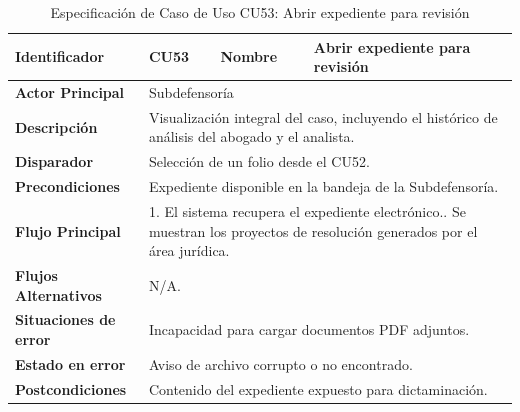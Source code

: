 \vspace{0.8cm}

\begingroup
\setlength{\parskip}{0pt}
\begin{longtable}{|p{3.5cm}|p{2cm}|p{2.5cm}|p{7cm}|}
\caption{Especificación de Caso de Uso CU53: Abrir expediente para revisión}
\label{tab:cu53} \\
\hline
\textbf{Identificador} & CU53 & \textbf{Nombre} & Abrir expediente para revisión \\ \hline
\textbf{Actor Principal} & \multicolumn{3}{p{11.5cm}|}{Subdefensoría} \\ \hline
\textbf{Descripción} & \multicolumn{3}{p{11.5cm}|}{Visualización integral del caso, incluyendo el histórico de análisis del abogado y el analista.} \\ \hline
\textbf{Disparador} & \multicolumn{3}{p{11.5cm}|}{Selección de un folio desde el CU52.} \\ \hline
\textbf{Precondiciones} & \multicolumn{3}{p{11.5cm}|}{Expediente disponible en la bandeja de la Subdefensoría.} \\ \hline
\textbf{Flujo Principal} & \multicolumn{3}{p{11.5cm}|}{1. El sistema recupera el expediente electrónico.\newline 2. Se muestran los proyectos de resolución generados por el área jurídica.} \\ \hline
\textbf{Flujos Alternativos} & \multicolumn{3}{p{11.5cm}|}{N/A.} \\ \hline
\textbf{Situaciones de error} & \multicolumn{3}{p{11.5cm}|}{Incapacidad para cargar documentos PDF adjuntos.} \\ \hline
\textbf{Estado en error} & \multicolumn{3}{p{11.5cm}|}{Aviso de archivo corrupto o no encontrado.} \\ \hline
\textbf{Postcondiciones} & \multicolumn{3}{p{11.5cm}|}{Contenido del expediente expuesto para dictaminación.} \\ \hline
\end{longtable}
\endgroup

\vspace{0.8cm}

